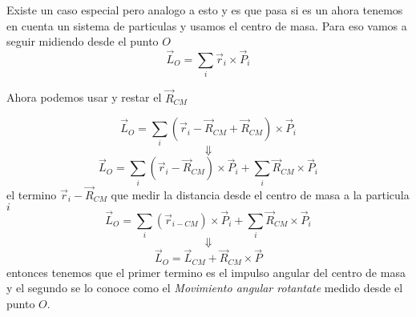 \documentclass[../Main.tex]{subfiles}
\begin{document}
{    Existe un caso especial pero analogo a esto y es que pasa si es un
    ahora tenemos en cuenta un sistema de particulas y usamos el centro
    de masa. Para eso vamos a seguir midiendo desde el punto $O$
    \begin{equation*}
        \vec{L}_O = \sum _i \vec{r}_i \times \vec{P}_i
    \end{equation*}

}

\npage{
}
{
    Ahora podemos usar y restar el $\vec{R}_{CM}$

    \begin{equation*}
        \vec{L}_O = \sum _i \left( \vec{r}_i - \vec{R}_{CM} + \vec{R}_{CM} \right) \times \vec{P}_i
    \end{equation*}
    \begin{equation*}
        \Downarrow
    \end{equation*}
    \begin{equation*}
        \vec{L}_O = \sum _i \left( \vec{r}_i - \vec{R}_{CM} \right) \times \vec{P}_i + \sum _i \vec{R}_{CM} \times \vec{P}_i
    \end{equation*}
    el termino $\vec{r}_i - \vec{R}_{CM}$ que medir la distancia desde
    el centro de masa a la particula $i$
    \begin{equation*}
        \vec{L}_O = \sum _i \left( \vec{r}_{i-CM} \right) \times \vec{P}_i + \sum _i \vec{R}_{CM} \times \vec{P}_i
    \end{equation*}
    \begin{equation*}
        \Downarrow
    \end{equation*}
    \begin{equation*}
        \vec{L}_O = \vec{L}_{CM} + \vec{R}_{CM} \times \vec{P}
    \end{equation*}
    entonces tenemos que el primer termino es el impulso angular del
    centro de masa y el segundo se lo conoce como el
    \textit{Movimiento angular rotantate} medido desde el punto $O$.

}
\end{document}
